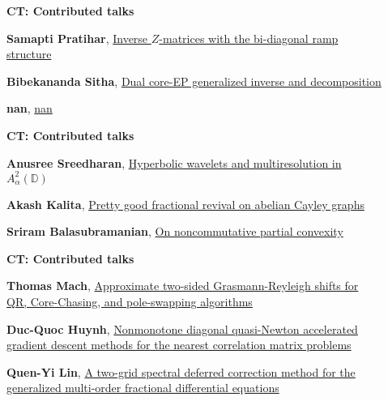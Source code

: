 \documentclass[ILAS2025-program.tex]{subfiles}
\begin{document}
\begin{description}
\begin{description}
        \end{description}
    \begin{description}
    \item[] {\color{mstitle}\textbf{CT: Contributed talks}} 
    \item[] \hypertarget{up0404}{}\textbf{Samapti Pratihar}, \hyperlink{down0404}{Inverse $Z$-matrices with the bi-diagonal ramp structure}
        \item[] \hypertarget{up0405}{}\textbf{Bibekananda Sitha}, \hyperlink{down0405}{Dual core-EP generalized inverse and decomposition}
        \item[] \hypertarget{up0406}{}\textbf{nan}, \hyperlink{down0406}{nan}
        \end{description}
    \begin{description}
    \item[] {\color{mstitle}\textbf{CT: Contributed talks}} 
    \item[] \hypertarget{up0407}{}\textbf{Anusree Sreedharan}, \hyperlink{down0407}{Hyperbolic wavelets and multiresolution in $A_{\alpha}^{2} (\mathbb{D})$}
        \item[] \hypertarget{up0408}{}\textbf{Akash Kalita}, \hyperlink{down0408}{Pretty good fractional revival on abelian Cayley graphs}
        \item[] \hypertarget{up0409}{}\textbf{Sriram Balasubramanian}, \hyperlink{down0409}{On noncommutative partial convexity}
        \end{description}
    \begin{description}
    \item[] {\color{mstitle}\textbf{CT: Contributed talks}} 
    \item[] \hypertarget{up0410}{}\textbf{Thomas Mach}, \hyperlink{down0410}{Approximate two-sided Grasmann-Reyleigh shifts for QR, Core-Chasing, and pole-swapping algorithms}
        \item[] \hypertarget{up0411}{}\textbf{Duc-Quoc Huynh}, \hyperlink{down0411}{Nonmonotone diagonal quasi-Newton accelerated gradient descent methods for the nearest correlation matrix problems}
        \item[] \hypertarget{up0412}{}\textbf{Quen-Yi Lin}, \hyperlink{down0412}{A two-grid spectral deferred correction method for the generalized multi-order fractional differential equations}

\end{description}
\end{description}
\end{document}
